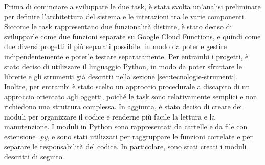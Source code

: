 Prima di cominciare a sviluppare le due task, è stata svolta un'analisi preliminare per definire l'architettura del sistema e le interazioni tra le varie componenti. Siccome le task rappresentano due funzionalità distinte, è stato deciso di svilupparle come due funzioni separate su Google Cloud Functions, e quindi come due diversi progetti il più separati possibile, in modo da poterle gestire indipendentemente e poterle testare separatamente.
Per entrambi i progetti, è stato deciso di utilizzare il linguaggio Python, in modo da poter sfruttare le librerie e gli strumenti già descritti nella sezione \ref{sec:tecnologie-strumenti}.
Inoltre, per entrambi è stato scelto un approccio procedurale a discapito di un approccio orientato agli oggetti, poiché le task sono relativamente semplici e non richiedono una struttura complessa. In aggiunta, è stato deciso di creare dei moduli per organizzare il codice e renderne più facile la lettura e la manutenzione.
I moduli in Python sono rappresentati da cartelle e da file con estensione \emph{.py}, e sono stati utilizzati per raggruppare le funzioni correlate e per separare le responsabilità del codice. In particolare, sono stati creati i moduli descritti di seguito.


